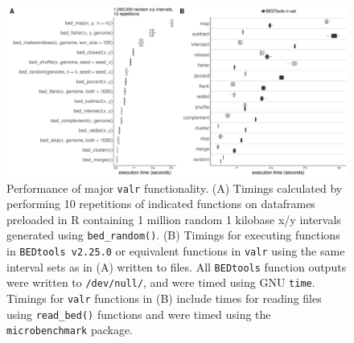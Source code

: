 \documentclass[9pt,a4paper]{extarticle}
\begin{document}
\begin{figure}[!htb]
\centering
\includegraphics[width=1\textwidth]{figure3.pdf}
\caption{\label{fig:Figure 3} Performance of major \texttt{valr} functionality. \textnormal{(A)  Timings calculated by performing 10 repetitions of indicated functions on dataframes preloaded in R containing 1 million random 1 kilobase x/y intervals generated using \texttt{bed\_random()}. (B) Timings for executing functions in \texttt{BEDtools v2.25.0} or equivalent functions in \texttt{valr} using the same interval sets as in (A) written to files. All \texttt{BEDtools} function outputs were written to \texttt{/dev/null/}, and were timed using GNU \texttt{time}. Timings for \texttt{valr} functions in (B) include times for reading files using \texttt{read\_bed()} functions and were timed using the \texttt{microbenchmark} package.}}
\end{figure}


\end{document}
